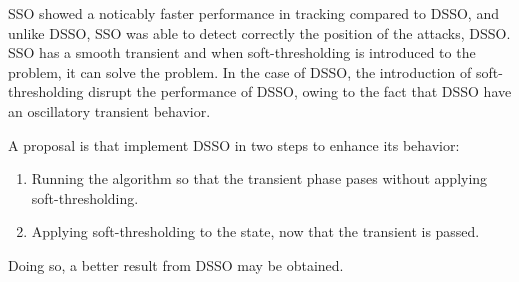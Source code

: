 SSO showed a noticably faster performance in tracking compared to DSSO, and unlike DSSO, SSO was able to detect correctly the position of the attacks, DSSO. SSO has a smooth transient and when soft-thresholding is introduced to the problem, it can solve the problem. In the case of DSSO, the introduction of soft-thresholding disrupt the performance of DSSO, owing to the fact that DSSO have an oscillatory transient behavior.

A proposal is that implement DSSO in two steps to enhance its behavior:
\begin{enumerate}
	\item Running the algorithm so that the transient phase pases without applying soft-thresholding.
	\item Applying soft-thresholding to the state, now that the transient is passed.
\end{enumerate}

Doing so, a better result from DSSO may be obtained.










